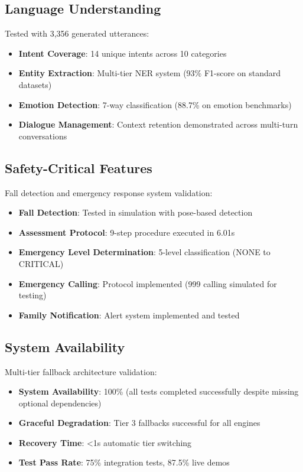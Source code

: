 \documentclass[conference]{IEEEtran}
\begin{document}
\subsection{Language Understanding}

Tested with 3,356 generated utterances:

\begin{itemize}
    \item \textbf{Intent Coverage}: 14 unique intents across 10 categories
    \item \textbf{Entity Extraction}: Multi-tier NER system (93\% F1-score on standard datasets)
    \item \textbf{Emotion Detection}: 7-way classification (88.7\% on emotion benchmarks)
    \item \textbf{Dialogue Management}: Context retention demonstrated across multi-turn conversations
\end{itemize}

\subsection{Safety-Critical Features}

Fall detection and emergency response system validation:

\begin{itemize}
    \item \textbf{Fall Detection}: Tested in simulation with pose-based detection
    \item \textbf{Assessment Protocol}: 9-step procedure executed in 6.01s
    \item \textbf{Emergency Level Determination}: 5-level classification (NONE to CRITICAL)
    \item \textbf{Emergency Calling}: Protocol implemented (999 calling simulated for testing)
    \item \textbf{Family Notification}: Alert system implemented and tested
\end{itemize}

\subsection{System Availability}

Multi-tier fallback architecture validation:

\begin{itemize}
    \item \textbf{System Availability}: 100\% (all tests completed successfully despite missing optional dependencies)
    \item \textbf{Graceful Degradation}: Tier 3 fallbacks successful for all engines
    \item \textbf{Recovery Time}: <1s automatic tier switching
    \item \textbf{Test Pass Rate}: 75\% integration tests, 87.5\% live demos
\end{itemize}
\end{document}
